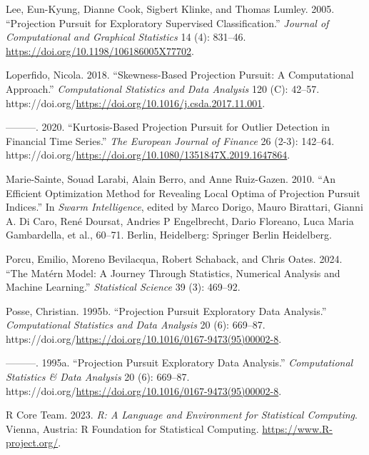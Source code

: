 \documentclass[
  12pt,
]{interact}
\newlength{\cslhangindent}
\newlength{\cslentryspacingunit} %
\newenvironment{CSLReferences}[2] %
 {%
  \setlength{\parindent}{0pt}
  \ifodd #1
  \let\oldpar\par
  \def\par{\hangindent=\cslhangindent\oldpar}
  \fi
  \setlength{\parskip}{#2\cslentryspacingunit}
 }%
 {}
\theoremstyle{plain}
\begin{document}
\begin{CSLReferences}{1}{0}
\leavevmode{}%
Lee, Eun-Kyung, Dianne Cook, Sigbert Klinke, and Thomas Lumley. 2005.
{``Projection Pursuit for Exploratory Supervised Classification.''}
\emph{Journal of Computational and Graphical Statistics} 14 (4):
831--46. \url{https://doi.org/10.1198/106186005X77702}.

\leavevmode{}%
Loperfido, Nicola. 2018. {``Skewness-Based Projection Pursuit: A
Computational Approach.''} \emph{Computational Statistics and Data
Analysis} 120 (C): 42--57.
https://doi.org/\url{https://doi.org/10.1016/j.csda.2017.11.001}.

\leavevmode{}%
---------. 2020. {``Kurtosis-Based Projection Pursuit for Outlier
Detection in Financial Time Series.''} \emph{The European Journal of
Finance} 26 (2-3): 142--64.
https://doi.org/\url{https://doi.org/10.1080/1351847X.2019.1647864}.

\leavevmode{}%
Marie-Sainte, Souad Larabi, Alain Berro, and Anne Ruiz-Gazen. 2010.
{``An Efficient Optimization Method for Revealing Local Optima of
Projection Pursuit Indices.''} In \emph{Swarm Intelligence}, edited by
Marco Dorigo, Mauro Birattari, Gianni A. Di Caro, René Doursat, Andries
P Engelbrecht, Dario Floreano, Luca Maria Gambardella, et al., 60--71.
Berlin, Heidelberg: Springer Berlin Heidelberg.

\leavevmode{}%
Porcu, Emilio, Moreno Bevilacqua, Robert Schaback, and Chris Oates.
2024. {``The {M}atérn Model: A Journey Through Statistics, Numerical
Analysis and Machine Learning.''} \emph{Statistical Science} 39 (3):
469--92.

\leavevmode{}%
Posse, Christian. 1995b. {``Projection Pursuit Exploratory Data
Analysis.''} \emph{Computational Statistics and Data Analysis} 20 (6):
669--87.
https://doi.org/\url{https://doi.org/10.1016/0167-9473(95)00002-8}.

\leavevmode{}%
---------. 1995a. {``Projection Pursuit Exploratory Data Analysis.''}
\emph{Computational Statistics \& Data Analysis} 20 (6): 669--87.
https://doi.org/\url{https://doi.org/10.1016/0167-9473(95)00002-8}.

\leavevmode{}%
R Core Team. 2023. \emph{R: A Language and Environment for Statistical
Computing}. Vienna, Austria: R Foundation for Statistical Computing.
\url{https://www.R-project.org/}.


\end{CSLReferences}
\end{document}
